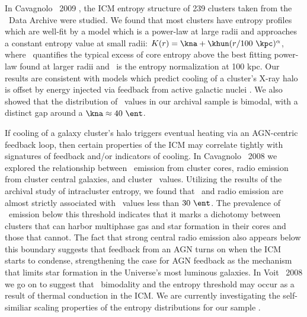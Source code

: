 \documentclass[letterpaper,12pt]{article}
\begin{document}
In Cavagnolo \etal\ 2009 \cite{accept}, the ICM entropy structure of
239 clusters taken from the \chandra\ Data Archive were studied. We
found that most clusters have entropy profiles which are well-fit by a
model which is a power-law at large radii and approaches a constant
entropy value at small radii: $K(r) = \kna + \khun (r/100
~\kpc)^{\alpha}$, where \kna\ quantifies the typical excess of core
entropy above the best fitting power-law found at larger radii and
\khun\ is the entropy normalization at 100 kpc. Our results are
consistent with models which predict cooling of a cluster's X-ray halo
is offset by energy injected via feedback from active galactic nuclei
\cite[\eg][]{agnframework}. We also showed that the distribution of
\kna\ values in our archival sample is bimodal, with a distinct gap
around a $\kna \approx 40 ~\ent$.

If cooling of a galaxy cluster's halo triggers eventual heating via an
AGN-centric feedback loop, then certain properties of the ICM may
correlate tightly with signatures of feedback and/or indicators of
cooling. In Cavagnolo \etal\ 2008 \cite{haradent} we explored the
relationship between \halpha\ emission from cluster cores, radio
emission from cluster central galaxies, and cluster
\kna\ values. Utilizing the results of the archival study of
intracluster entropy, we found that \halpha\ and radio emission are
almost strictly associated with \kna\ values less than $30 ~\ent$. The
prevalence of \halpha\ emission below this threshold indicates that it
marks a dichotomy between clusters that can harbor multiphase gas and
star formation in their cores and those that cannot. The fact that
strong central radio emission also appears below this boundary
suggests that feedback from an AGN turns on when the ICM starts to
condense, strengthening the case for AGN feedback as the mechanism
that limits star formation in the Universe's most luminous
galaxies. In Voit \etal\ 2008 \cite{conduction} we go on to suggest
that \kna\ bimodality and the entropy threshold may occur as a result
of thermal conduction in the ICM. We are currently investigating the
self-similiar scaling properties of the entropy distributions for our
sample \cite{entscale}.
\end{document}
